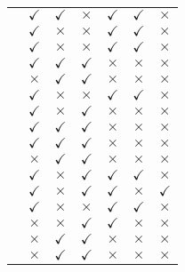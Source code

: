 \begin{table}[h]
\begin{tabular}{p{5cm}cccccc}
\cite{Ahmadi-2011} & $\checkmark$  &  $\checkmark$ &  $\times$ & $\checkmark$ & $\checkmark$ & $\times$\\
\cite{Deb2012} &  $\checkmark$ &  $\times$ &  $\times$ & $\checkmark$ & $\checkmark$ & $\times$\\
\cite{Basu-11} &  $\checkmark$ &  $\times$ &  $\times$ & $\checkmark$ & $\checkmark$ & $\times$\\
\cite{Berrios-2011} &  $\checkmark$ &  $\checkmark$ &  $\checkmark$ & $\times$ & $\times$ & $\times$\\
\cite{Habi-2011} &  $\times$ &  $\checkmark$ &  $\checkmark$ & $\times$ & $\times$ & $\times$\\
\cite{Mazur-2009} &  $\checkmark$ &  $\times$ &  $\times$ & $\checkmark$ & $\checkmark$ & $\times$\\
\cite{Moon-2011} &  $\checkmark$ &  $\times$ &  $\checkmark$ & $\times$ & $\times$ & $\times$\\
\cite{Liu2010} &  $\checkmark$ &  $\checkmark$ &  $\checkmark$ & $\times$ & $\times$ & $\times$\\
\cite{Bare-2005} &  $\checkmark$ &  $\checkmark$ &  $\checkmark$ & $\times$ & $\times$ & $\times$\\
\cite{Mastacan-2005} &  $\times$ &  $\checkmark$ &  $\checkmark$ & $\times$ & $\times$ & $\times$\\
\cite{Rashidi-2011} &  $\checkmark$ &  $\times$ &  $\checkmark$ & $\checkmark$ & $\checkmark$ & $\times$\\
\cite{Suresh-2011} &  $\checkmark$ &  $\times$ &  $\checkmark$ & $\checkmark$ & $\times$ & $\checkmark$\\
\cite{Sayyaadi-2011} &  $\checkmark$ &  $\times$ &  $\times$ & $\checkmark$ & $\checkmark$ & $\times$\\
\cite{Saez-2007} &  $\times$ &  $\times$ &  $\checkmark$ & $\checkmark$ & $\times$ & $\times$\\
\cite{Kwun-2007} &  $\times$ &  $\checkmark$ &  $\checkmark$ & $\times$ & $\times$ & $\times$\\
\cite{Tamiru-2009} &  $\times$ &  $\checkmark$ &  $\checkmark$ & $\times$ & $\times$ & $\times$\\
 \bottomrule
 \end{tabular}
\end{table}

